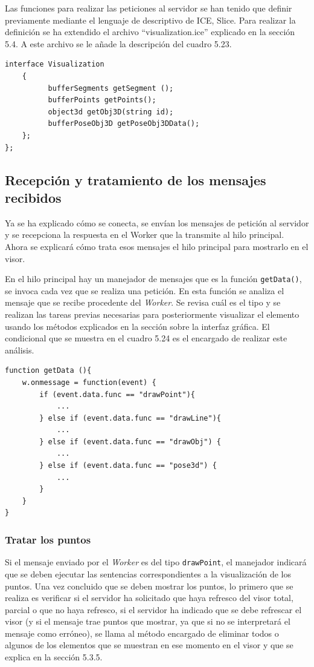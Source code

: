 Las funciones para realizar las peticiones al servidor se han tenido que definir previamente mediante el lenguaje de descriptivo de ICE, Slice. Para realizar la definición se ha extendido el archivo ``visualization.ice'' explicado en la sección 5.4. A este archivo se le añade la descripción del cuadro 5.23.

\begin{lstlisting}[caption= Código añadido a las definiciones Slice creadas, label=cod.extensionslice]
interface Visualization
	{
	      bufferSegments getSegment ();
	      bufferPoints getPoints();
	      object3d getObj3D(string id);
	      bufferPoseObj3D getPoseObj3DData();
	};
};

\end{lstlisting}

\subsection{Recepción y tratamiento de los mensajes recibidos}
Ya se ha explicado cómo se conecta, se envían los mensajes de petición al servidor y se recepciona la respuesta en el Worker que la transmite al hilo principal. Ahora se explicará cómo trata esos mensajes el hilo principal para mostrarlo en el visor.

En el hilo principal hay un manejador de mensajes que es la función \texttt{getData()}, se invoca cada vez que se realiza una petición. En esta función se analiza el mensaje que se recibe procedente del \textit{Worker}. Se revisa cuál es el tipo y se realizan las tareas previas necesarias para posteriormente visualizar el elemento usando los métodos explicados en la sección sobre la interfaz gráfica. El condicional que se muestra en el cuadro 5.24 es el encargado de realizar este análisis.

\begin{lstlisting}[caption= Manejador que analiza los mensajes recibidos, label=cod.manejador]
function getData (){
	w.onmessage = function(event) {
		if (event.data.func == "drawPoint"){
			...
		} else if (event.data.func == "drawLine"){
			...
		} else if (event.data.func == "drawObj") {
			...
		} else if (event.data.func == "pose3d") {
			...
		}
	}
}
\end{lstlisting}

\subsubsection{Tratar los puntos}
Si el mensaje enviado por el \textit{Worker} es del tipo \texttt{drawPoint}, el manejador indicará que se deben ejecutar las sentencias correspondientes a la visualización de los puntos. Una vez concluido que se deben mostrar los puntos, lo primero que se realiza es verificar si el servidor ha solicitado que haya refresco del visor total, parcial o que no haya refresco, si el servidor ha indicado que se debe refrescar el visor (y si el mensaje trae puntos que mostrar, ya que si no se interpretará el mensaje como erróneo), se llama al método encargado de eliminar todos o algunos de los elementos que se muestran en ese momento en el visor y que se explica en la sección 5.3.5. 

